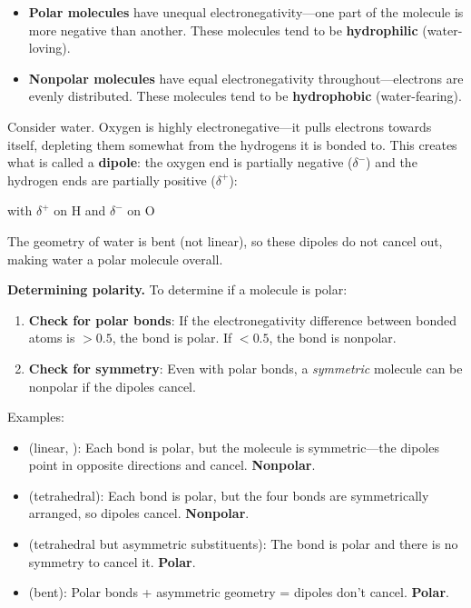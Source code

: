 \documentclass{report}
\begin{document}
\begin{itemize}
    \item \textbf{Polar molecules} have unequal electronegativity---one part of the molecule is more negative than another. These molecules tend to be \textbf{hydrophilic} (water-loving).
    \item \textbf{Nonpolar molecules} have equal electronegativity throughout---electrons are evenly distributed. These molecules tend to be \textbf{hydrophobic} (water-fearing).
\end{itemize}

Consider water. Oxygen is highly electronegative---it pulls electrons towards itself, depleting them somewhat from the hydrogens it is bonded to. This creates what is called a \textbf{dipole}: the oxygen end is partially negative (\(\delta^{-}\)) and the hydrogen ends are partially positive (\(\delta^{+}\)):
\begin{center}
 \quad with \quad \(\delta^{+}\) on H and \(\delta^{-}\) on O
\end{center}
The geometry of water is bent (not linear), so these dipoles do not cancel out, making water a polar molecule overall.

\textbf{Determining polarity.} To determine if a molecule is polar:
\begin{enumerate}
    \item \textbf{Check for polar bonds}: If the electronegativity difference between bonded atoms is \(> 0.5\), the bond is polar. If \(< 0.5\), the bond is nonpolar.
    \item \textbf{Check for symmetry}: Even with polar bonds, a \emph{symmetric} molecule can be nonpolar if the dipoles cancel.
\end{enumerate}
Examples:
\begin{itemize}
    \item {} (linear, ): Each  bond is polar, but the molecule is symmetric---the dipoles point in opposite directions and cancel. \textbf{Nonpolar}.
    \item {} (tetrahedral): Each  bond is polar, but the four bonds are symmetrically arranged, so dipoles cancel. \textbf{Nonpolar}.
    \item {} (tetrahedral but asymmetric substituents): The  bond is polar and there is no symmetry to cancel it. \textbf{Polar}.
    \item {} (bent): Polar bonds + asymmetric geometry = dipoles don't cancel. \textbf{Polar}.
\end{itemize}
\end{document}

